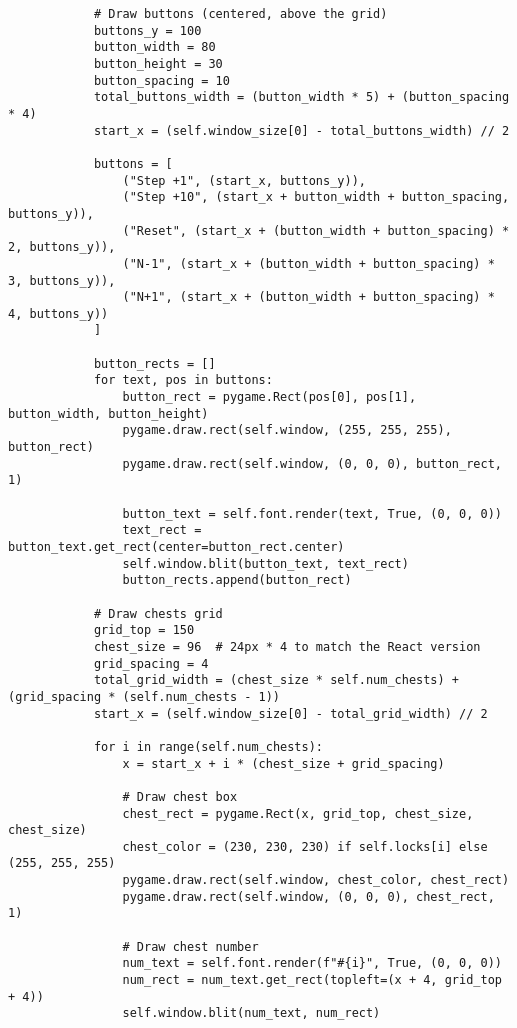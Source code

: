 \begin{lstlisting}
            # Draw buttons (centered, above the grid)
            buttons_y = 100
            button_width = 80
            button_height = 30
            button_spacing = 10
            total_buttons_width = (button_width * 5) + (button_spacing * 4)
            start_x = (self.window_size[0] - total_buttons_width) // 2
            
            buttons = [
                ("Step +1", (start_x, buttons_y)),
                ("Step +10", (start_x + button_width + button_spacing, buttons_y)),
                ("Reset", (start_x + (button_width + button_spacing) * 2, buttons_y)),
                ("N-1", (start_x + (button_width + button_spacing) * 3, buttons_y)),
                ("N+1", (start_x + (button_width + button_spacing) * 4, buttons_y))
            ]
            
            button_rects = []
            for text, pos in buttons:
                button_rect = pygame.Rect(pos[0], pos[1], button_width, button_height)
                pygame.draw.rect(self.window, (255, 255, 255), button_rect)
                pygame.draw.rect(self.window, (0, 0, 0), button_rect, 1)
                
                button_text = self.font.render(text, True, (0, 0, 0))
                text_rect = button_text.get_rect(center=button_rect.center)
                self.window.blit(button_text, text_rect)
                button_rects.append(button_rect)
            
            # Draw chests grid
            grid_top = 150
            chest_size = 96  # 24px * 4 to match the React version
            grid_spacing = 4
            total_grid_width = (chest_size * self.num_chests) + (grid_spacing * (self.num_chests - 1))
            start_x = (self.window_size[0] - total_grid_width) // 2
            
            for i in range(self.num_chests):
                x = start_x + i * (chest_size + grid_spacing)
                
                # Draw chest box
                chest_rect = pygame.Rect(x, grid_top, chest_size, chest_size)
                chest_color = (230, 230, 230) if self.locks[i] else (255, 255, 255)
                pygame.draw.rect(self.window, chest_color, chest_rect)
                pygame.draw.rect(self.window, (0, 0, 0), chest_rect, 1)
                
                # Draw chest number
                num_text = self.font.render(f"#{i}", True, (0, 0, 0))
                num_rect = num_text.get_rect(topleft=(x + 4, grid_top + 4))
                self.window.blit(num_text, num_rect)
                

\end{lstlisting}
